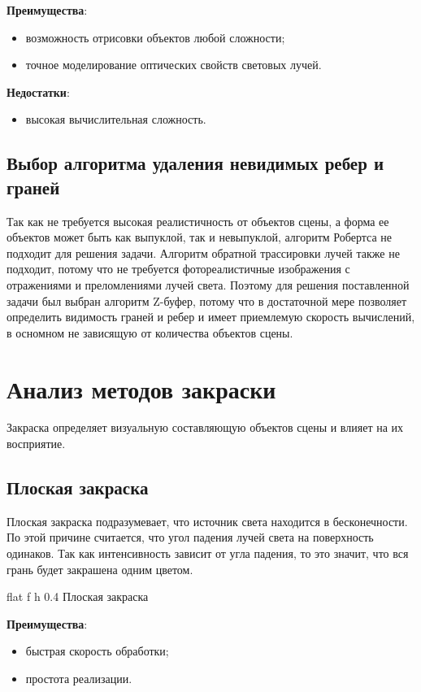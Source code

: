 \textbf{Преимущества}:
\begin{itemize}
    \item возможность отрисовки объектов любой сложности;
    \item точное моделирование оптических свойств световых лучей.
\end{itemize}

\textbf{Недостатки}:
\begin{itemize}
    \item высокая вычислительная сложность.
\end{itemize}


\subsection{Выбор алгоритма удаления невидимых ребер и граней}

Так как не требуется высокая реалистичность от объектов сцены, а форма ее объектов
может быть как выпуклой, так и невыпуклой, алгоритм Робертса не подходит для решения задачи.
Алгоритм обратной трассировки лучей также не подходит, потому что не требуется
фотореалистичные изображения с отражениями и преломлениями лучей света. Поэтому
для решения поставленной задачи был выбран алгоритм Z-буфер, потому что
в достаточной мере позволяет определить видимость граней и ребер и имеет
приемлемую скорость вычислений, в осномном не зависящую от количества объектов сцены.


\section{Анализ методов закраски}
Закраска определяет визуальную составляющую объектов сцены и влияет на их восприятие.

\subsection{Плоская закраска}

Плоская закраска подразумевает, что источник света находится в бесконечности. По этой причине
считается, что угол падения лучей света на поверхность одинаков. Так как интенсивность зависит от угла падения,
то это значит, что вся грань будет закрашена одним цветом.


{flat}
{f}
{h}
{0.4\textwidth}
{Плоская закраска}

\textbf{Преимущества}:
\begin{itemize}
    \item быстрая скорость обработки;
    \item простота реализации.
\end{itemize}

